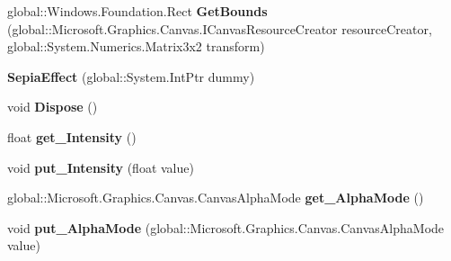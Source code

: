 \begin{DoxyCompactItemize}
\mbox{\label{class_microsoft_1_1_graphics_1_1_canvas_1_1_effects_1_1_sepia_effect_a383c90027b969cb3a3d212a103518d83}} 
global\+::\+Windows.\+Foundation.\+Rect {\bfseries Get\+Bounds} (global\+::\+Microsoft.\+Graphics.\+Canvas.\+I\+Canvas\+Resource\+Creator resource\+Creator, global\+::\+System.\+Numerics.\+Matrix3x2 transform)
\item 
\mbox{\label{class_microsoft_1_1_graphics_1_1_canvas_1_1_effects_1_1_sepia_effect_a4f03d37d7ecbcbf4f61d46c7966819d0}} 
{\bfseries Sepia\+Effect} (global\+::\+System.\+Int\+Ptr dummy)
\item 
\mbox{\label{class_microsoft_1_1_graphics_1_1_canvas_1_1_effects_1_1_sepia_effect_a3195a9cdd413f190255cdcda3170755b}} 
void {\bfseries Dispose} ()
\item 
\mbox{\label{class_microsoft_1_1_graphics_1_1_canvas_1_1_effects_1_1_sepia_effect_aa2ff226eed0accddfe57da8d29180372}} 
float {\bfseries get\+\_\+\+Intensity} ()
\item 
\mbox{\label{class_microsoft_1_1_graphics_1_1_canvas_1_1_effects_1_1_sepia_effect_a31889c7859564211fe6944237497aa2d}} 
void {\bfseries put\+\_\+\+Intensity} (float value)
\item 
\mbox{\label{class_microsoft_1_1_graphics_1_1_canvas_1_1_effects_1_1_sepia_effect_ac68e49d7dca255583a419f008aae3de1}} 
global\+::\+Microsoft.\+Graphics.\+Canvas.\+Canvas\+Alpha\+Mode {\bfseries get\+\_\+\+Alpha\+Mode} ()
\item 
\mbox{\label{class_microsoft_1_1_graphics_1_1_canvas_1_1_effects_1_1_sepia_effect_a754dd727263b3e8cdf81de68d07ff1f9}} 
void {\bfseries put\+\_\+\+Alpha\+Mode} (global\+::\+Microsoft.\+Graphics.\+Canvas.\+Canvas\+Alpha\+Mode value)
\item 
\mbox{\label{class_microsoft_1_1_graphics_1_1_canvas_1_1_effects_1_1_sepia_effect_ae31d49568b53d15b07d27ddd36ab1436}} 

\end{DoxyCompactItemize}
